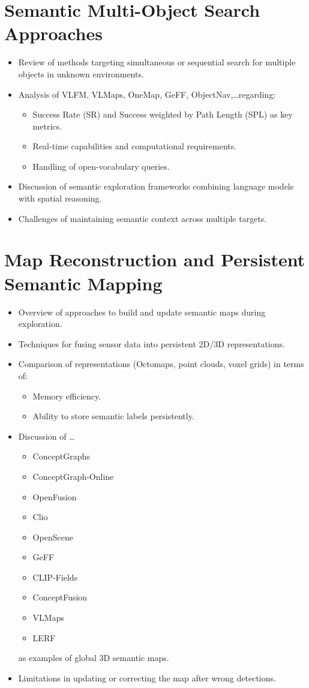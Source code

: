 \section{Semantic Multi-Object Search Approaches}
\begin{itemize}
    \item Review of methods targeting simultaneous or sequential search for multiple objects in unknown environments.
    \item Analysis of VLFM, VLMaps, OneMap, GeFF, ObjectNav,\dots regarding:
    \begin{itemize}
        \item Success Rate (SR) and Success weighted by Path Length (SPL) as key metrics.
        \item Real-time capabilities and computational requirements.
        \item Handling of open-vocabulary queries.
    \end{itemize}
    \item Discussion of semantic exploration frameworks combining language models with spatial reasoning.
    \item Challenges of maintaining semantic context across multiple targets.
\end{itemize}

\section{Map Reconstruction and Persistent Semantic Mapping}
\begin{itemize}
    \item Overview of approaches to build and update semantic maps during exploration.
    \item Techniques for fusing sensor data into persistent 2D/3D representations.
    \item Comparison of representations (Octomaps, point clouds, voxel grids) in terms of:
    \begin{itemize}
        \item Memory efficiency.
        \item Ability to store semantic labels persistently.
    \end{itemize}
    \item Discussion of \dots
    \begin{itemize}
        \item ConceptGraphs
        \item ConceptGraph-Online
        \item OpenFusion
        \item Clio
        \item OpenScene
        \item GeFF
        \item CLIP-Fields
        \item ConceptFusion
        \item VLMaps
        \item LERF
    \end{itemize}
    as examples of global 3D semantic maps.
    \item Limitations in updating or correcting the map after wrong detections.
\end{itemize}

